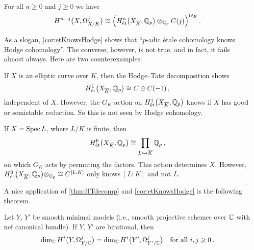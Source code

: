 \begin{cor}\label{cor:etKnowsHodge}
	For all $n\geq 0$ and $j\geq 0$ we have
	\begin{equation*}
		H^{n-j}\big(X,\Omega_{X/K}^j\big)\cong \Big(H_\et^n\big(X_{\ov{K}},\IQ_p\big)\otimes_{\IQ_p}C(j)\Big)^{\smash{G_K}}\,.
	\end{equation*}
\end{cor}
\begin{cntx}
	As a slogan, \cref{cor:etKnowsHodge} shows that \enquote{$p$-adic étale cohomology knows Hodge cohomology}. The converse, however, is not true, and in fact, it fails almost always. Here are two counterexamples.
	\begin{numerate}
		\item If $X$ is an elliptic curve over $K$, then the Hodge--Tate decomposition shows
		\begin{equation*}
			H_\et^1\big(X_{\ov{K}},\IQ_p\big)\cong C\oplus C(-1)\,,
		\end{equation*}
		independent of $X$. However, the $G_K$-action on $H_\et^1\big(X_{\ov{K}},\IQ_p\big)$ knows if $X$ has good or semistable reduction. So this is not seen by Hodge cohomology.
		\item If $X=\operatorname{Spec} L$, where $L/K$ is finite, then
		\begin{equation*}
			H_\et^0\big(X_{\ov{K}},\IQ_p\big)\cong \prod_{L\monomorphism\ov{K}}\IQ_p\,,
		\end{equation*}
		on which $G_K$ acts by permuting the factors. This action determines $X$. However, $H_\et^0\big(X_{\ov{K}},\IQ_p\big)\otimes_{\IQ_p}\cong C^{[L:K]}$ only knows $[L:K]$ and not $L$.
	\end{numerate}
\end{cntx}
A nice application of \cref{thm:HTdecomp} and \cref{cor:etKnowsHodge} is the following theorem.
\begin{thm}\label{thm:MinimalModels}
	Let $Y$, $Y'$ be smooth minimal models (i.e., smooth projective schemes over $\mathbb{C}$ with nef canonical bundle). If $Y$, $Y'$ are birational, then
	\begin{equation*}
		\dim_{\mathbb{C}} H^i\big(Y,\Omega_{Y/\mathbb{C}}^j\big)=\dim_{\mathbb{C}} H^i\big(Y',\Omega_{Y'/\mathbb{C}}^j\big)\quad\text{for all }i,j\geqslant 0\,.
	\end{equation*}
\end{thm}

